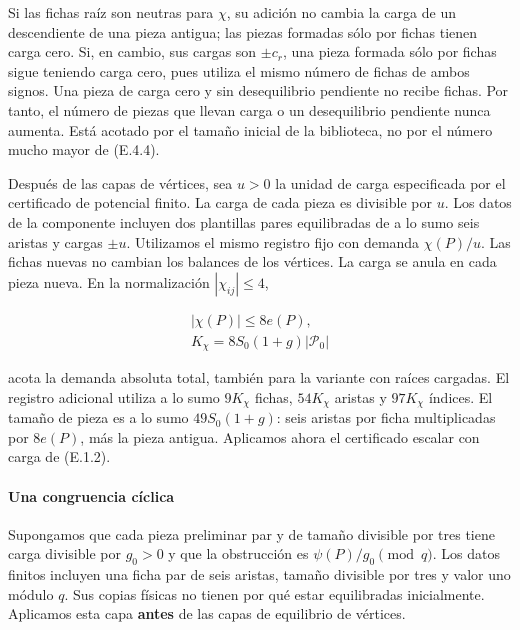 \documentclass[spanish,11pt,a4paper]{article}
\begin{document}
Si las fichas raíz son neutras para \(\chi\), su adición no cambia la carga de un descendiente de una pieza antigua; las piezas formadas sólo por fichas tienen carga cero. Si, en cambio, sus cargas son \(\pm c_r\), una pieza formada sólo por fichas sigue teniendo carga cero, pues utiliza el mismo número de fichas de ambos signos. Una pieza de carga cero y sin desequilibrio pendiente no recibe fichas. Por tanto, el número de piezas que llevan carga o un desequilibrio pendiente nunca aumenta. Está acotado por el tamaño inicial de la biblioteca, no por el número mucho mayor de (E.4.4).

Después de las capas de vértices, sea \(u>0\) la unidad de carga especificada por el certificado de potencial finito. La carga de cada pieza es divisible por \(u\). Los datos de la componente incluyen dos plantillas pares equilibradas de a lo sumo seis aristas y cargas \(\pm u\). Utilizamos el mismo registro fijo con demanda \(\chi(P)/u\). Las fichas nuevas no cambian los balances de los vértices. La carga se anula en cada pieza nueva. En la normalización \(|\chi_{ij}|\le4\),

\[\begin{gathered}
|\chi(P)|\le8e(P),\\
K_\chi=8S_0(1+g)|\mathcal P_0|
\end{gathered}
\tag{E.5.1}\]

acota la demanda absoluta total, también para la variante con raíces cargadas. El registro adicional utiliza a lo sumo \(9K_\chi\) fichas, \(54K_\chi\) aristas y \(97K_\chi\) índices. El tamaño de pieza es a lo sumo \(49S_0(1+g)\): seis aristas por ficha multiplicadas por \(8e(P)\), más la pieza antigua. Aplicamos ahora el certificado escalar con carga de (E.1.2).

\paragraph{Una congruencia cíclica}\label{una-congruencia-cuxedclica}

Supongamos que cada pieza preliminar par y de tamaño divisible por tres tiene carga divisible por \(g_0>0\) y que la obstrucción es \(\psi(P)/g_0\pmod q\). Los datos finitos incluyen una ficha par de seis aristas, tamaño divisible por tres y valor uno módulo \(q\). Sus copias físicas no tienen por qué estar equilibradas inicialmente. Aplicamos esta capa \textbf{antes} de las capas de equilibrio de vértices.
\end{document}
